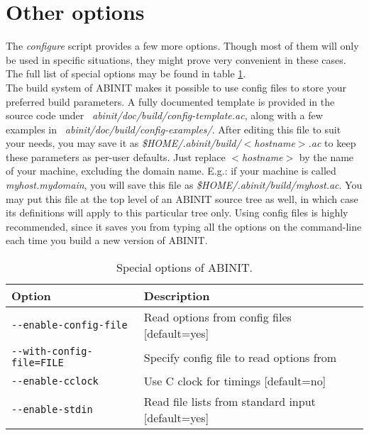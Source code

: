 \section{Other options}

The \textit{configure} script provides a few more options. Though
most of them will only be used in specific situations, they might
prove very convenient in these cases. The full list of special options
may be found in table \ref{tab:opt-special}. \\


The build system of ABINIT makes it possible to use config files to
store your preferred build parameters. A fully documented template
is provided in the source code under \textit{~abinit/doc/build/config-template.ac},
along with a few examples in \textit{~abinit/doc/build/config-examples/}.
After editing this file to suit your needs, you may save it as \textit{\$HOME/.abinit/build/$<$hostname$>$.ac}
to keep these parameters as per-user defaults. Just replace \textit{$<$hostname$>$}
by the name of your machine, excluding the domain name. E.g.: if your
machine is called \textit{myhost.mydomain}, you will save this file
as \textit{\$HOME/.abinit/build/myhost.ac}. You may put this file
at the top level of an ABINIT source tree as well, in which case its
definitions will apply to this particular tree only. Using config
files is highly recommended, since it saves you from typing all the
options on the command-line each time you build a new version of ABINIT.
\\


%
\begin{table}
\begin{centering}
\begin{tabular}{|l|l|}
\hline 
\textbf{Option}  & \textbf{Description} \tabularnewline
\hline 
\texttt{-{-}enable-config-file}  & Read options from config files {[}default=yes{]} \tabularnewline
\texttt{-{-}with-config-file=FILE}  & Specify config file to read options from \tabularnewline
\hline 
\texttt{-{-}enable-cclock}  & Use C clock for timings {[}default=no{]} \tabularnewline
\hline 
\texttt{-{-}enable-stdin}  & Read file lists from standard input {[}default=yes{]} \tabularnewline
\hline
\end{tabular}
\par\end{centering}

\caption{Special options of ABINIT.}


\label{tab:opt-special} 
\end{table}

